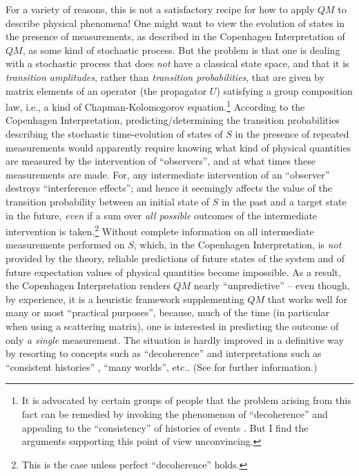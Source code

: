 \documentclass[a4paper,11pt]{article}
\begin{document}
For a variety of reasons, this is not a satisfactory recipe for how to apply $QM$ to describe physical phenomena! One might want to view the evolution of states in the presence of measurements, as described in the Copenhagen Interpretation of $QM$, as some kind of stochastic process. But the problem is that one is dealing with a stochastic process that does \textit{not} have a classical state space, and that it is \textit{transition amplitudes}, rather than \textit{transition probabilities}, that are given by matrix elements of an operator (the propagator $U$) satisfying a group composition law, i.e., a kind of Chapman-Kolomogorov equation.\footnote{It is advocated by certain groups of people that the problem arising from this fact can be remedied by invoking the phenomenon of ``decoherence'' and appealing to the ``consistency'' of histories of events \cite{Griffiths}. But I find the arguments supporting this point of view unconvincing.} According to the Copenhagen Interpretation, predicting/determining the transition probabilities describing the stochastic time-evolution of states of $S$ in the presence of repeated measurements would apparently require knowing what kind of physical quantities are measured by the intervention of ``observers'', and at what times these measurements are made. For, any intermediate intervention of an ``observer'' destroys ``interference effects''; and hence it seemingly affects the value of the transition probability between an initial state of $S$ in the past and a target state in the future, \textit{even} if a sum over \textit{all possible} outcomes of the intermediate intervention is taken.\footnote{This is the case unless perfect ``decoherence'' holds.} Without complete information on all intermediate measurements performed on $S$, which, in the Copenhagen Interpretation, is \textit{not} provided by the theory, reliable predictions of future states of the system and of future expectation values of physical quantities become impossible. As a result, the Copenhagen Interpretation renders $QM$ nearly ``unpredictive'' -- even though, by experience, it is a heuristic framework supplementing $QM$ that works well for many or most ``practical purposes'', because, much of the time (in particular when using a scattering matrix), one is interested in predicting the outcome of only \textit{a single} measurement. The situation is hardly improved in a definitive way by resorting to concepts such as ``decoherence'' and interpretations such as ``consistent histories'' \cite{Griffiths}, ``many worlds'', etc.. (See \cite{Bell-book, Durr-Teufel} for further information.)
\end{document}
